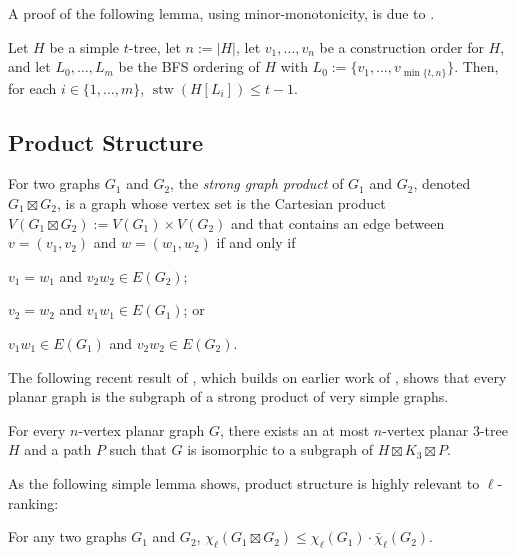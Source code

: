\documentclass[kpfonts]{patmorin}
\DeclareMathOperator{\stw}{stw}
\newcommand{\lrn}{\chi_{\ell}}
\newcommand{\dlcn}{\bar{\chi}_\ell}
\theoremstyle{named}
\begin{document}
A proof of the following lemma, using minor-monotonicity, is due to \citet{wood:personal}.

\begin{lem}\label{simple-bfs-layers}
    Let $H$ be a simple $t$-tree, let $n:=|H|$, let $v_1,\ldots,v_n$ be a construction order for $H$, and let $L_0,\ldots,L_m$ be the BFS ordering of $H$ with $L_0:=\{v_1,\ldots,v_{\min\{t,n\}}\}$.   Then, for each $i\in\{1,\ldots,m\}$, $\stw(H[L_i])\le t-1$.
\end{lem}


\subsection{Product Structure}

For two graphs $G_1$ and $G_2$, the \emph{strong graph product} of $G_1$ and $G_2$, denoted $G_1\boxtimes G_2$, is a graph whose vertex set is the Cartesian product $V(G_1\boxtimes G_2):= V(G_1)\times V(G_2)$ and that contains an edge between $v=(v_1,v_2)$ and $w=(w_1,w_2)$ if and only if
\begin{inparaenum}[(i)]
    \item $v_1=w_1$ and $v_2w_2\in E(G_2)$;
    \item $v_2=w_2$ and $v_1w_1\in E(G_1)$; or
    \item $v_1w_1\in E(G_1)$ and $v_2w_2\in E(G_2)$.
\end{inparaenum}

The following recent result of \citet{dujmovic.joret.ea:planar}, which builds on earlier work of \citet{pilipczuk.siebertz:polynomial}, shows that every planar graph is the subgraph of a strong product of very simple graphs.

\begin{thm}\label{product-structure}
    For every $n$-vertex planar graph $G$, there exists an at most $n$-vertex planar 3-tree $H$ and a path $P$ such that $G$ is isomorphic to a subgraph of $H\boxtimes K_3\boxtimes P$.
\end{thm}

As the following simple lemma shows, product structure is highly relevant to $\ell$-ranking:

\begin{lem}\label{product-lemma}
    For any two graphs $G_1$ and $G_2$, $\lrn(G_1\boxtimes G_2)\le \lrn(G_1)\cdot\dlcn(G_2)$.
\end{lem}
\end{document}
